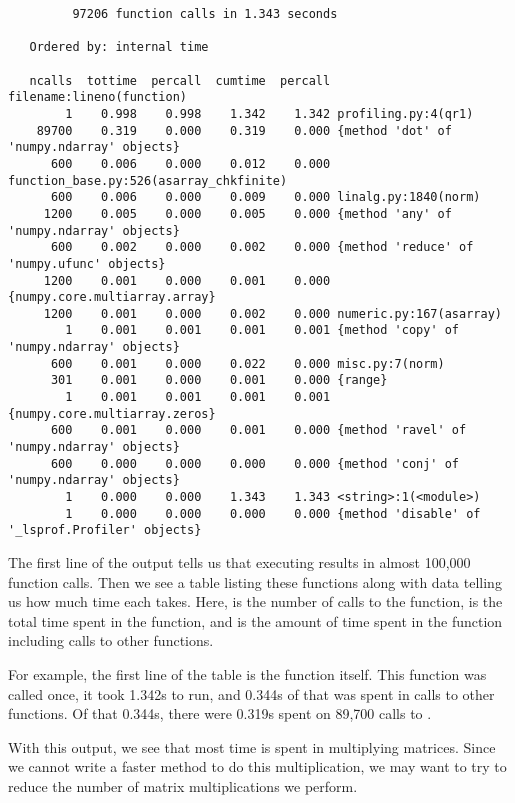 {\scriptsize
\begin{verbatim}
         97206 function calls in 1.343 seconds

   Ordered by: internal time

   ncalls  tottime  percall  cumtime  percall filename:lineno(function)
        1    0.998    0.998    1.342    1.342 profiling.py:4(qr1)
    89700    0.319    0.000    0.319    0.000 {method 'dot' of 'numpy.ndarray' objects}
      600    0.006    0.000    0.012    0.000 function_base.py:526(asarray_chkfinite)
      600    0.006    0.000    0.009    0.000 linalg.py:1840(norm)
     1200    0.005    0.000    0.005    0.000 {method 'any' of 'numpy.ndarray' objects}
      600    0.002    0.000    0.002    0.000 {method 'reduce' of 'numpy.ufunc' objects}
     1200    0.001    0.000    0.001    0.000 {numpy.core.multiarray.array}
     1200    0.001    0.000    0.002    0.000 numeric.py:167(asarray)
        1    0.001    0.001    0.001    0.001 {method 'copy' of 'numpy.ndarray' objects}
      600    0.001    0.000    0.022    0.000 misc.py:7(norm)
      301    0.001    0.000    0.001    0.000 {range}
        1    0.001    0.001    0.001    0.001 {numpy.core.multiarray.zeros}
      600    0.001    0.000    0.001    0.000 {method 'ravel' of 'numpy.ndarray' objects}
      600    0.000    0.000    0.000    0.000 {method 'conj' of 'numpy.ndarray' objects}
        1    0.000    0.000    1.343    1.343 <string>:1(<module>)
        1    0.000    0.000    0.000    0.000 {method 'disable' of '_lsprof.Profiler' objects}
\end{verbatim}
}

The first line of the output tells us that executing  results in almost 100,000 function calls.
Then we see a table listing these functions along with data telling us how much time each takes.
Here,  is the number of calls to the function,  is the total time spent in the function, and  is the amount of time spent in the function including calls to other functions.

For example, the first line of the table is the function  itself.
This function was called once, it took 1.342s to run, and 0.344s of that was spent in calls to other functions.
Of that 0.344s, there were 0.319s spent on 89,700 calls to .

With this output, we see that most time is spent in multiplying matrices.
Since we cannot write a faster method to do this multiplication, we may want to try to reduce the number of matrix multiplications we perform.

